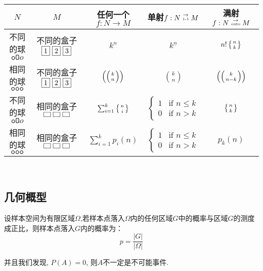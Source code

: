{\center \begin{tabular}[pos]{|c|c|ccc|}
  \hline
  $N$ & $M$ & 任何一个$f:N\to M$ & 单射$f:N\stackrel{\to}{\text{\tiny 1-1}} M$ & 满射$f:N\stackrel{\to}{\text{\tiny onto}} M$   \\
  \hline
  不同的球$\texttt{oO}o$ & 不同的盒子$\fbox{1}~\fbox{2}~\fbox{3}$ & $k^n$ & $k^{\underline n}$ & $n!\left\{{n \atop k}\right\}$\\
  相同的球$\texttt{ooo}$ & 不同的盒子$\fbox{1}~\fbox{2}~\fbox{3}$ & $\left(\left({k \atop n}\right)\right)$ & ${k\choose n}$ & $\left(\left({k \atop n-k}\right)\right)$\\
  不同的球$\texttt{oO}o$ & 相同的盒子$\fbox{~}~\fbox{~}~\fbox{~}$ & $\sum_{i=1}^k \left\{{n \atop i}\right\}$ & $\begin{cases}1 & \text{if }n\leq k\\ 0& \text{if }n>k\end{cases}$ & $\left\{{n \atop k}\right\}$\\
  相同的球$\texttt{ooo}$ & 相同的盒子$\fbox{~}~\fbox{~}~\fbox{~}$ & $\sum_{i=1}^k p_i(n)$ & $\begin{cases}1 & \text{if }n\leq k\\ 0& \text{if }n>k\end{cases}$ & $p_k(n)$\\
  \hline
\end{tabular}\\}

\subsection{几何概型}

\begin{definition}
    设样本空间为有限区域$\Omega$,若样本点落入$\Omega$内的任何区域$G$中的概率与区域$G$的测度成正比，则样本点落入$G$内的概率为：
    $$
        p=\frac{\vert G\vert}{\vert \Omega \vert}
    $$
\end{definition}

并且我们发现, $P(A)=0$, 则$A$不一定是不可能事件. 




